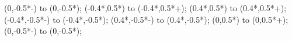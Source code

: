 {{\begin{scope}
        \fi
        \ifconnectsf
             (0,-0.5*\morphismheight-\savedlengths)
                to (0,-0.5*\morphismheight);
        \fi
        \ifconnectnwr
             (-0.4*\overallwidth,0.5*\morphismheight)
                to (-0.4*\overallwidth,0.5*\morphismheight+\savedlengthnw);
        \fi
        \ifconnectner
             (0.4*\overallwidth,0.5*\morphismheight)
                to (0.4*\overallwidth,0.5*\morphismheight+\savedlengthne);
        \fi
        \ifconnectswr
             (-0.4*\overallwidth,-0.5*\morphismheight-\savedlengthsw)
                to (-0.4*\overallwidth,-0.5*\morphismheight);
        \fi
        \ifconnectser
             (0.4*\overallwidth,-0.5*\morphismheight-\savedlengthse)
                to (0.4*\overallwidth,-0.5*\morphismheight);
        \fi
        \ifconnectnr
             (0,0.5*\morphismheight)
                to (0,0.5*\morphismheight+\savedlengthn);
        \fi
        \ifconnectsr
             (0,-0.5*\morphismheight-\savedlengths)
                to (0,-0.5*\morphismheight);
        \fi
    \end{scope}
    }
}
